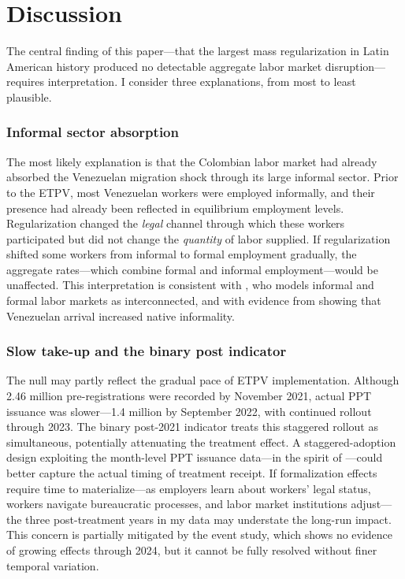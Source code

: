 \documentclass[12pt]{article}
\begin{document}
\section{Discussion}

The central finding of this paper---that the largest mass regularization in Latin American history produced no detectable aggregate labor market disruption---requires interpretation. I consider three explanations, from most to least plausible.

\subsubsection*{Informal sector absorption} The most likely explanation is that the Colombian labor market had already absorbed the Venezuelan migration shock through its large informal sector. Prior to the ETPV, most Venezuelan workers were employed informally, and their presence had already been reflected in equilibrium employment levels. Regularization changed the \textit{legal} channel through which these workers participated but did not change the \textit{quantity} of labor supplied. If regularization shifted some workers from informal to formal employment gradually, the aggregate rates---which combine formal and informal employment---would be unaffected. This interpretation is consistent with \citet{ulyssea2020informality}, who models informal and formal labor markets as interconnected, and with evidence from \citet{lebow2023immigration} showing that Venezuelan arrival increased native informality.

\subsubsection*{Slow take-up and the binary post indicator} The null may partly reflect the gradual pace of ETPV implementation. Although 2.46 million pre-registrations were recorded by November 2021, actual PPT issuance was slower---1.4 million by September 2022, with continued rollout through 2023. The binary post-2021 indicator treats this staggered rollout as simultaneous, potentially attenuating the treatment effect. A staggered-adoption design exploiting the month-level PPT issuance data---in the spirit of \citet{callaway2021difference}---could better capture the actual timing of treatment receipt. If formalization effects require time to materialize---as employers learn about workers' legal status, workers navigate bureaucratic processes, and labor market institutions adjust---the three post-treatment years in my data may understate the long-run impact. This concern is partially mitigated by the event study, which shows no evidence of growing effects through 2024, but it cannot be fully resolved without finer temporal variation.
\end{document}
